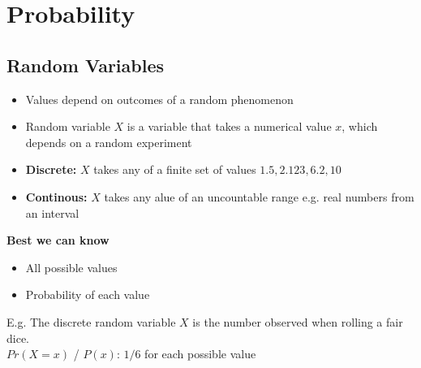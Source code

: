 \section{Probability}
\subsection{Random Variables}
\begin{itemize}
    \item Values depend on outcomes of a random phenomenon
    \item Random variable $X$ is a variable that takes a numerical value $x$, which depends on a random experiment
    \item \textbf{Discrete:} $X$ takes any of a finite set of values ${1.5, 2.123, 6.2, 10}$
    \item \textbf{Continous:} $X$ takes any alue of an uncountable range e.g. real numbers from an interval
\end{itemize}
\textbf{Best we can know}
\begin{itemize}
    \item All possible values
    \item Probability of each value
\end{itemize}
E.g. The discrete random variable $X$ is the number observed when rolling a fair dice.\\ 
$Pr(X=x)$ / $P(x)$: $1/6$ for each possible value

